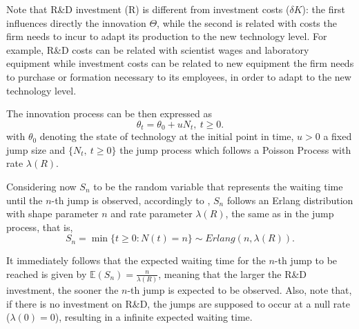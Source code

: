 
Note that R\&D investment (R) is different from investment costs ($\delta K$): the first influences directly the innovation $\Theta$, while the second is related with costs the firm needs to incur to adapt its production to the new technology level.
For example, R\&D costs can be related with scientist wages and laboratory equipment while investment costs can be related to new equipment the firm needs to purchase or formation necessary to its employees, in order to adapt to the new technology level.



The innovation process can be then expressed as
$$\theta_t=\theta_0+uN_t, \ t\geq 0.$$ 
with $\theta_0$ denoting the state of technology at the initial point in time, $u>0$ a fixed jump size and $\{ N_t, \ t \geq 0 \}$ the jump process which follows a Poisson Process with rate $\lambda(R)$. 

Considering now $S_n$ to be the random variable that represents the waiting time until the $n$-th jump is observed, accordingly to \cite{ross}, $S_n$ follows an Erlang distribution with shape parameter $n$ and rate parameter $\lambda(R)$, the same as in the jump process, that is,
$$S_n=\min \{t\geq 0: N(t)=n \} \sim Erlang(n,\lambda(R)).$$

It immediately follows that the expected waiting time for the $n$-th jump to be reached is given by $\mathds{E}(S_n)=\frac{n}{\lambda(R)}$, meaning that the larger the R\&D investment, the sooner the $n$-th jump is expected to be observed. Also, note that, if there is no investment on R\&D, the jumps are supposed to occur at a null rate ($\lambda(0)=0$), resulting in a infinite expected waiting time.

